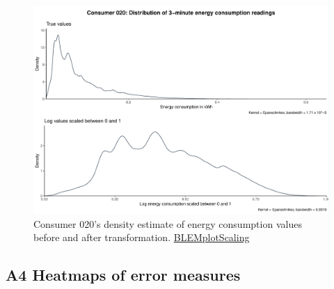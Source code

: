 \begin{centering}
\begin{figure}[!htbp]
        \includegraphics[width=\textwidth-0.85cm]{thesis/graphs/c020_density.pdf}
        \caption[Energy consumption distribution before and after transformation]{Consumer 020's density estimate of energy consumption values before and after transformation. \quantnet\href{ }{BLEMplotScaling}}
\end{figure}
\end{centering}

\newpage
\subsection*{A4 Heatmaps of error measures}\label{App:Figures:heatmaps}

